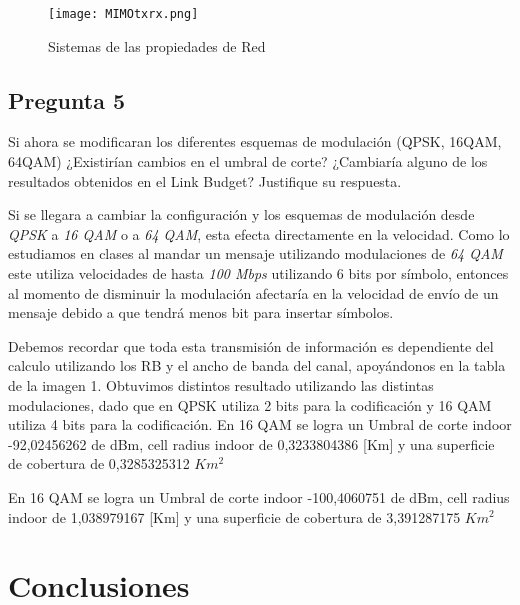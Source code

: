 \documentclass[Article, letterpaper,12pt]{article}
\begin{document}
\begin{figure}[H]
    \centering
    \texttt{[image: MIMOtxrx.png]}
    \caption{Sistemas de las propiedades de Red}
    \label{fig:my_label}
\end{figure}


\subsection{Pregunta 5}
Si ahora se modificaran los diferentes esquemas de modulación (QPSK, 16QAM, 64QAM) ¿Existirían cambios en el umbral
de corte? ¿Cambiaría alguno de los resultados obtenidos en el Link Budget? Justifique su respuesta.

Si se llegara a cambiar la configuración y los esquemas de modulación desde \textit{QPSK} a \textit{16 QAM} o a \textit{64 QAM}, esta efecta directamente en la velocidad. Como lo estudiamos en clases al mandar un mensaje utilizando modulaciones de \textit{64 QAM} este utiliza velocidades de hasta \textit{100 Mbps} utilizando 6 bits por símbolo, entonces al momento de disminuir la modulación afectaría en la velocidad de envío de un mensaje debido a que tendrá menos bit para insertar símbolos.

Debemos recordar que toda esta transmisión de información es dependiente del calculo utilizando los RB y el ancho de banda del canal, apoyándonos en la tabla de la imagen 1.
Obtuvimos distintos resultado utilizando las distintas modulaciones, dado que en QPSK utiliza 2 bits para la codificación y 16 QAM utiliza 4 bits para la codificación.
En 16 QAM se logra un Umbral de corte indoor -92,02456262 de dBm, cell radius indoor de 0,3233804386 [Km] y una superficie de cobertura	de 0,3285325312 $Km^{2}$

En 16 QAM se logra un Umbral de corte indoor -100,4060751 de dBm, cell radius indoor de 1,038979167 [Km] y una superficie de cobertura	de 3,391287175 $Km^{2}$





\section{Conclusiones}
\end{document}
